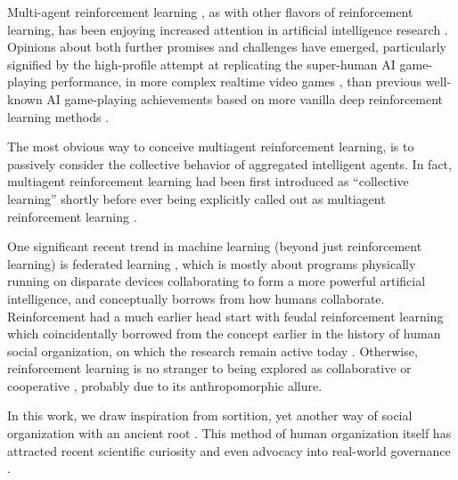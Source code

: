 \documentclass[twoside]{article}
\begin{document}
Multi-agent reinforcement learning \cite{collective-1993,multiagent-1994-most-cited,multiagent-2021-most-cited}, as with other flavors of reinforcement learning, has been enjoying increased attention in artificial intelligence research \cite{unified-multiagent}.
Opinions about both further promises and challenges have emerged, particularly signified by the
high-profile attempt at replicating the super-human AI game-playing performance, in more complex realtime video games \cite{nature-starcraft},
than previous well-known AI game-playing achievements based on more vanilla deep reinforcement learning methods \cite{nature-ATARI,nature-go-2}.

The most obvious way to conceive multiagent reinforcement learning, is to passively consider the collective behavior of aggregated intelligent agents.
In fact, multiagent reinforcement learning had been first introduced as ``collective learning'' \cite{collective-1993} shortly before ever being explicitly called out as multiagent reinforcement learning \cite{multiagent-1994-most-cited}.


One significant recent trend in machine learning (beyond just reinforcement learning) is federated learning \cite{federated-learning-2021}, which is mostly about programs physically running on disparate devices collaborating to form a more powerful artificial intelligence, and conceptually borrows from how humans collaborate.  Reinforcement had a much earlier head start with feudal reinforcement learning \cite{feudal-1992} which coincidentally borrowed from the concept earlier in the history of human social organization, on which the research remain active today \cite{Johnson2020FeudalSH}.
Otherwise, reinforcement learning is no stranger to being explored as
collaborative \cite{Kok2006CollaborativeMR} or
cooperative \cite{Qiu2021RMIXLR}, probably due to its anthropomorphic allure.

In this work, we draw inspiration from sortition, yet another way of social organization with an ancient root \cite{sortition-ancient}.
This method of human organization itself has attracted recent scientific curiosity and even advocacy into real-world governance \cite{nature-sortition,Sintomer2018FromDT,sortition-2013}.
\end{document}
